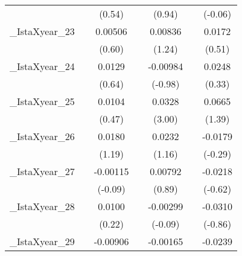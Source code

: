 {\begin{tabular}{l*{6}{c}}
            &                     &      (0.54)         &                     &      (0.94)         &                     &     (-0.06)         \\
[1em]
\_IstaXyear\_23&                     &     0.00506         &                     &     0.00836         &                     &      0.0172         \\
            &                     &      (0.60)         &                     &      (1.24)         &                     &      (0.51)         \\
[1em]
\_IstaXyear\_24&                     &      0.0129         &                     &    -0.00984         &                     &      0.0248         \\
            &                     &      (0.64)         &                     &     (-0.98)         &                     &      (0.33)         \\
[1em]
\_IstaXyear\_25&                     &      0.0104         &                     &      0.0328\sym{**} &                     &      0.0665         \\
            &                     &      (0.47)         &                     &      (3.00)         &                     &      (1.39)         \\
[1em]
\_IstaXyear\_26&                     &      0.0180         &                     &      0.0232         &                     &     -0.0179         \\
            &                     &      (1.19)         &                     &      (1.16)         &                     &     (-0.29)         \\
[1em]
\_IstaXyear\_27&                     &    -0.00115         &                     &     0.00792         &                     &     -0.0218         \\
            &                     &     (-0.09)         &                     &      (0.89)         &                     &     (-0.62)         \\
[1em]
\_IstaXyear\_28&                     &      0.0100         &                     &    -0.00299         &                     &     -0.0310         \\
            &                     &      (0.22)         &                     &     (-0.09)         &                     &     (-0.86)         \\
[1em]
\_IstaXyear\_29&                     &    -0.00906         &                     &    -0.00165         &                     &     -0.0239         \\

\end{tabular}}

